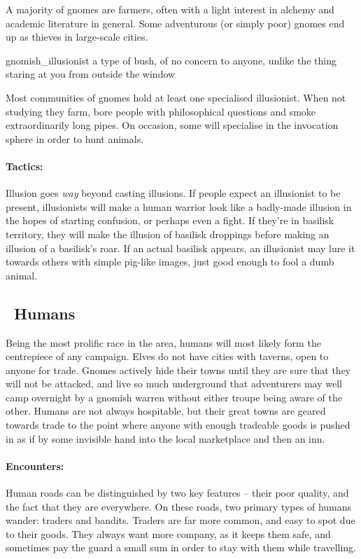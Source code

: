 \begin{multicols}{2}
A majority of gnomes are farmers, often with a light interest in alchemy and academic literature in general.  Some adventurous (or simply poor) gnomes end up as thieves in large-scale cities.


  {gnomish_illusionist}%
  {a type of bush, of no concern to anyone, unlike the thing staring at you from outside the window}%

Most communities of gnomes hold at least one specialised illusionist.  When not studying they farm, bore people with philosophical questions and smoke extraordinarily long pipes.  On occasion, some will specialise in the invocation sphere in order to hunt animals.


\paragraph{Tactics:} Illusion goes \emph{way} beyond casting illusions.
If people expect an illusionist to be present, illusionists will make a human warrior look like a badly-made illusion in the hopes of starting confusion, or perhaps even a fight.
If they're in basilisk territory, they will make the illusion of basilisk droppings before making an illusion of a basilisk's roar.
If an actual basilisk appears, an illusionist may lure it towards others with simple pig-like images, just good enough to fool a dumb animal.

\subsection[Humans]{\Hu\ Humans}

Being the most prolific race in the area, humans will most likely form the centrepiece of any campaign.
Elves do not have cities with taverns, open to anyone for trade.
Gnomes actively hide their towns until they are sure that they will not be attacked, and live so much underground that adventurers may well camp overnight by a gnomish warren without either troupe being aware of the other.
Humans are not always hospitable, but their great towns are geared towards trade to the point where anyone with enough tradeable goods is pushed in as if by some invisible hand into the local marketplace and then an inn.

\paragraph{Encounters:} Human roads can be distinguished by two key features -- their poor quality, and the fact that they are everywhere.
On these roads, two primary types of humans wander: traders and bandits.
Traders are far more common, and easy to spot due to their goods.
They always want more company, as it keeps them safe, and sometimes pay the \gls{guard} a small sum in order to stay with them while travelling.


\end{multicols}
